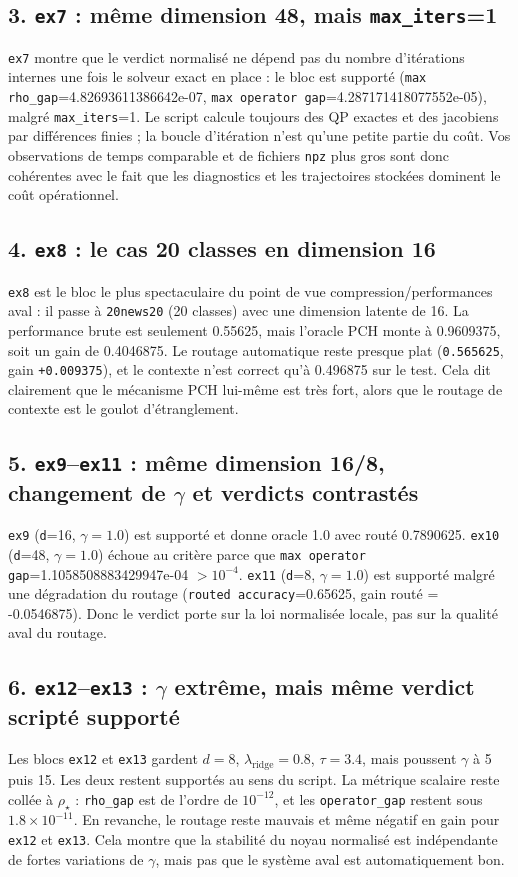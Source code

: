 \documentclass[11pt,a4paper]{article}
\newcommand{\code}[1]{\texttt{#1}}
\begin{document}
\subsection*{3. \code{ex7} : même dimension 48, mais \code{max\_iters}=1}
\code{ex7} montre que le verdict normalisé ne dépend pas du nombre d'itérations internes une fois le solveur exact en place : le bloc est supporté (\code{max rho\_gap}=4.82693611386642e-07, \code{max operator gap}=4.287171418077552e-05), malgré \code{max\_iters}=1. Le script calcule toujours des QP exactes et des jacobiens par différences finies ; la boucle d'itération n'est qu'une petite partie du coût. Vos observations de temps comparable et de fichiers \code{npz} plus gros sont donc cohérentes avec le fait que les diagnostics et les trajectoires stockées dominent le coût opérationnel.
\subsection*{4. \code{ex8} : le cas 20 classes en dimension 16}
\code{ex8} est le bloc le plus spectaculaire du point de vue compression/performances aval : il passe à \code{20news20} (20 classes) avec une dimension latente de 16. La performance brute est seulement 0.55625, mais l'oracle PCH monte à 0.9609375, soit un gain de 0.4046875. Le routage automatique reste presque plat (\code{0.565625}, gain \code{+0.009375}), et le contexte n'est correct qu'à 0.496875 sur le test. Cela dit clairement que le mécanisme PCH lui-même est très fort, alors que le routage de contexte est le goulot d'étranglement.
\subsection*{5. \code{ex9}--\code{ex11} : même dimension 16/8, changement de $\gamma$ et verdicts contrastés}
\code{ex9} (\code{d}=16, $\gamma=1.0$) est supporté et donne oracle 1.0 avec routé 0.7890625. \code{ex10} (\code{d}=48, $\gamma=1.0$) échoue au critère parce que \code{max operator gap}=1.1058508883429947e-04 $> 10^{-4}$. \code{ex11} (\code{d}=8, $\gamma=1.0$) est supporté malgré une dégradation du routage (\code{routed accuracy}=0.65625, gain routé = -0.0546875). Donc le verdict porte sur la loi normalisée locale, pas sur la qualité aval du routage.
\subsection*{6. \code{ex12}--\code{ex13} : $\gamma$ extrême, mais même verdict scripté supporté}
Les blocs \code{ex12} et \code{ex13} gardent $d=8$, $\lambda_{\mathrm{ridge}}=0.8$, $\tau=3.4$, mais poussent $\gamma$ à 5 puis 15. Les deux restent supportés au sens du script. La métrique scalaire reste collée à $\rho_\star$ : \code{rho\_gap} est de l'ordre de $10^{-12}$, et les \code{operator\_gap} restent sous $1.8\times 10^{-11}$. En revanche, le routage reste mauvais et même négatif en gain pour \code{ex12} et \code{ex13}. Cela montre que la stabilité du noyau normalisé est indépendante de fortes variations de $\gamma$, mais pas que le système aval est automatiquement bon.
\end{document}
